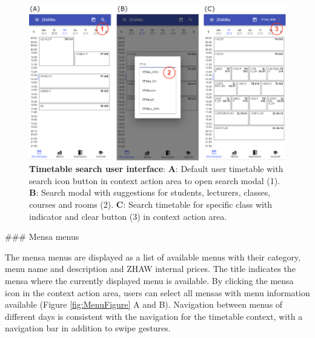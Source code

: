 \begin{markdown}
\begin{figure}[H]
  \includegraphics[width=16cm, center]{./figures/timetable_figure2.png}
  \captionsetup{width=15.5cm}
  \caption[Timetable search user interface]{\textbf{Timetable search user interface}: \textbf{A}: Default user timetable with search icon button in context action area to open search modal (1). \textbf{B}: Search modal with suggestions for students, lecturers, classes, courses and rooms (2). \textbf{C}: Search timetable for specific class with indicator and clear button (3) in context action area.}
  \label{fig:TimetableFigure2}
\end{figure}

### Mensa menus

The mensa menus are displayed as a list of available menus with their category, menu name and description and ZHAW internal prices. The title indicates the mensa where the currently displayed menu is available. By clicking the mensa icon in the context action area, users can select all mensas with menu information available (Figure \ref{fig:MenuFigure} A and B). Navigation between menus of different days is consistent with the navigation for the timetable context, with a navigation bar in addition to swipe gestures.


\end{markdown}
